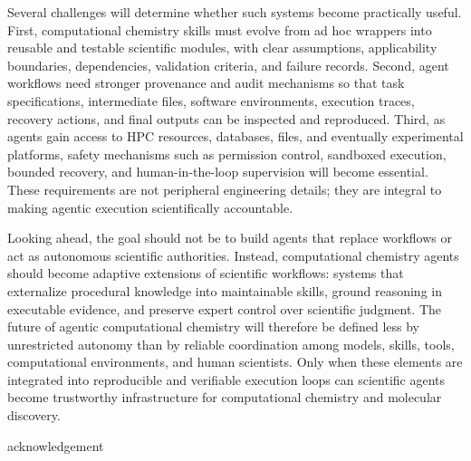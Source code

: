 \documentclass[journal=jacsat,manuscript=article]{achemso}
\begin{document}
Several challenges will determine whether such systems become practically useful. First, computational chemistry skills must evolve from ad hoc wrappers into reusable and testable scientific modules, with clear assumptions, applicability boundaries, dependencies, validation criteria, and failure records. Second, agent workflows need stronger provenance and audit mechanisms so that task specifications, intermediate files, software environments, execution traces, recovery actions, and final outputs can be inspected and reproduced. Third, as agents gain access to HPC resources, databases, files, and eventually experimental platforms, safety mechanisms such as permission control, sandboxed execution, bounded recovery, and human-in-the-loop supervision will become essential. These requirements are not peripheral engineering details; they are integral to making agentic execution scientifically accountable.

Looking ahead, the goal should not be to build agents that replace workflows or act as autonomous scientific authorities. Instead, computational chemistry agents should become adaptive extensions of scientific workflows: systems that externalize procedural knowledge into maintainable skills, ground reasoning in executable evidence, and preserve expert control over scientific judgment. The future of agentic computational chemistry will therefore be defined less by unrestricted autonomy than by reliable coordination among models, skills, tools, computational environments, and human scientists. Only when these elements are integrated into reproducible and verifiable execution loops can scientific agents become trustworthy infrastructure for computational chemistry and molecular discovery.


\begin{acknowledgement}

acknowledgement

\end{acknowledgement}

\end{document}
